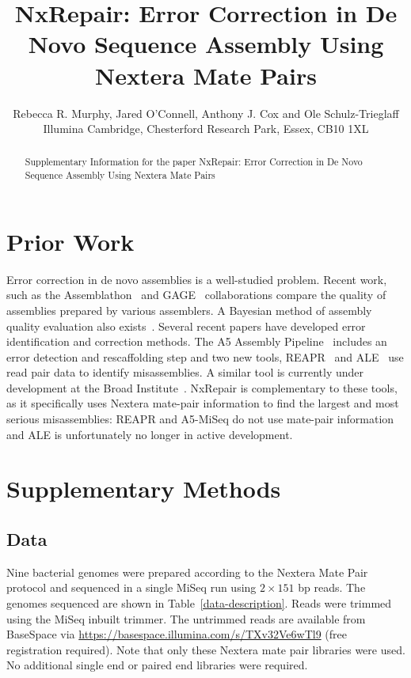 \documentclass[12pt]{article}
\begin{document}
\title{NxRepair: Error Correction in De Novo Sequence Assembly Using Nextera Mate Pairs}

\author{Rebecca R. Murphy, Jared O'Connell, Anthony J. Cox and Ole Schulz-Trieglaff \\ 
Illumina Cambridge, Chesterford Research Park, Essex, CB10 1XL}

\maketitle

\begin{abstract}
  Supplementary Information for the paper NxRepair: Error Correction in De Novo Sequence Assembly Using Nextera Mate Pairs 
\end{abstract}

\section{Prior Work}
Error correction in de novo assemblies is a well-studied problem. Recent work, such as the Assemblathon~\cite{Bradnam2013} and GAGE~\cite{Salzberg2012} collaborations compare the quality of assemblies prepared by various assemblers. A Bayesian method of assembly quality evaluation also exists~\cite{Ghodsi2013}. Several recent papers have developed error identification and correction methods. The A5 Assembly Pipeline~\cite{Coil2014} includes an error detection and rescaffolding step and two new tools, REAPR~\cite{Hunt2013} and ALE~\cite{Clark2013} use read pair data to identify misassemblies. A similar tool is currently under development at the Broad Institute~\cite{pilon2014}. NxRepair is complementary to these tools, as it specifically uses Nextera mate-pair information to find the largest and most serious misassemblies: REAPR and A5-MiSeq do not use mate-pair information and ALE is unfortunately no longer in active development.

\section{Supplementary Methods}
\subsection{Data}
Nine bacterial genomes were prepared according to the Nextera Mate Pair protocol and sequenced in a single MiSeq run using $2 \times 151$ bp reads. The genomes sequenced are shown in Table~\ref{data-description}. Reads were trimmed using the MiSeq inbuilt trimmer. The untrimmed reads are available from BaseSpace via \url{https://basespace.illumina.com/s/TXv32Ve6wTl9} (free registration required). Note that only these Nextera mate pair libraries were used. No additional single end or paired end libraries were required.   
\end{document}
